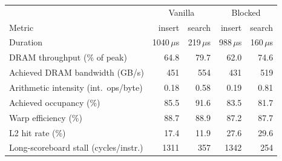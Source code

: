 \begin{tabular}{lrrrr}
\toprule
 & \multicolumn{2}{c}{Vanilla} & \multicolumn{2}{c}{Blocked} \\
Metric & insert & search & insert & search \\
\midrule
Duration & 1040\,$\mu$s & 219\,$\mu$s & 988\,$\mu$s & 160\,$\mu$s \\
DRAM throughput (\% of peak) & 64.8 & 79.7 & 62.0 & 74.6 \\
Achieved DRAM bandwidth (GB/s) & 451 & 554 & 431 & 519 \\
Arithmetic intensity (int.\ ops/byte) & 0.18 & 0.58 & 0.19 & 0.81 \\
Achieved occupancy (\%) & 85.5 & 91.6 & 83.5 & 81.7 \\
Warp efficiency (\%) & 88.7 & 88.9 & 87.2 & 87.7 \\
L2 hit rate (\%) & 17.4 & 11.9 & 27.6 & 29.6 \\
Long-scoreboard stall (cycles/instr.) & 1311 & 357 & 1342 & 254 \\
\bottomrule
\end{tabular}